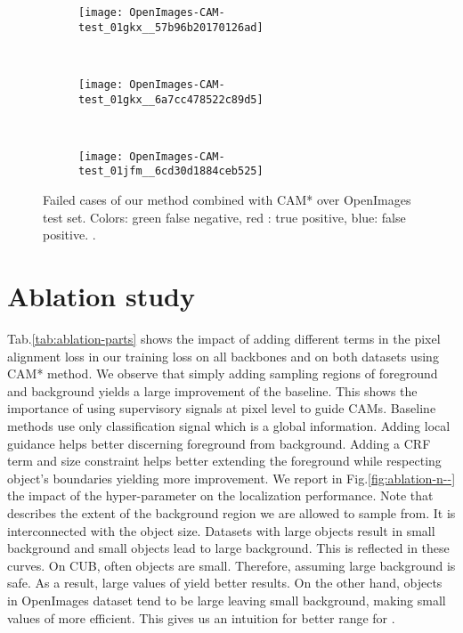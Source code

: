 \documentclass[twocolumn]{article}
\theoremstyle{definition}
\begin{document}
\begin{figure}
     \centering
     \begin{subfigure}[b]{0.45\textwidth}
         \centering
         \texttt{[image: OpenImages-CAM-test\_01gkx\_\_57b96b20170126ad]}
     \end{subfigure}
     \\
     \vspace{.2cm}
     \begin{subfigure}[b]{0.45\textwidth}
         \centering
         \texttt{[image: OpenImages-CAM-test\_01gkx\_\_6a7cc478522c89d5]}
     \end{subfigure}
     \\
     \vspace{.2cm}
     \begin{subfigure}[b]{0.45\textwidth}
         \centering
         \texttt{[image: OpenImages-CAM-test\_01jfm\_\_6cd30d1884ceb525]}
     \end{subfigure}
        \caption{Failed cases of our method combined with CAM* over OpenImages test set.
        Colors: green false negative, red : true positive, blue: false positive. .}
        \label{fig:failure}
\end{figure}

\section{Ablation study}
\label{sec:ablations}
Tab.\ref{tab:ablation-parts} shows the impact of adding different terms in the pixel alignment loss in our training loss on all backbones and on both datasets using CAM* method. We observe that simply adding sampling regions of foreground and background yields a large improvement of the baseline. This shows the importance of using supervisory signals at pixel level to guide CAMs. Baseline methods use only classification signal which is a global information. Adding local guidance helps better discerning foreground from background. Adding a CRF term and size constraint helps better extending the foreground while respecting object's boundaries yielding more improvement.
We report in Fig.\ref{fig:ablation-n--} the impact of the hyper-parameter  on the localization performance. Note that  describes the extent of the background region we are allowed to sample from. It is interconnected with the object size. Datasets with large objects result in small background and small objects lead to large background. This is reflected in these curves. On CUB, often objects are small. Therefore, assuming large background is safe. As a result, large values of   yield better results. On the other hand, objects in OpenImages dataset tend to be large leaving small background, making small values of  more efficient. This gives us an intuition for better range for .
\end{document}
